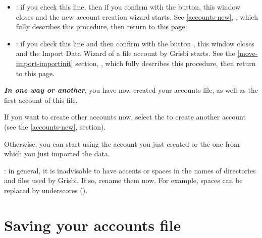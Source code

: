 \begin{enumerate}
\begin{itemize}
\item {}: if you check this line, then if you confirm with the  button, this window closes and the new account creation wizard starts. See  \vref{accounts-new}, ,  which fully describes this procedure, then return to this page:

\item {}: if you check this line and then confirm with the  button ,  this window closes and the Import Data Wizard of a file account by Grisbi starts. See the \vref{move-import-importinit} section, , which fully describes this procedure, then return to this page.
\end{itemize}
\end{enumerate}

\label{start-newfile-end}

\textit{\textbf{In one way or another}}, you have now created your accounts file, as well as the first account of this file.


If you want to create other accounts now, select the  to create another account (see the \vref{accounts-new},  section).


Otherwise, you can start using the account you just created or the one from which you just imported the data.


: in general, it is inadvisable to have accents or spaces in the names of directories and files used by Grisbi. If so, rename them now. For example, spaces can be replaced by underscores (\underline{}).

\newpage


\section{Saving your accounts file\label{start-save}}

